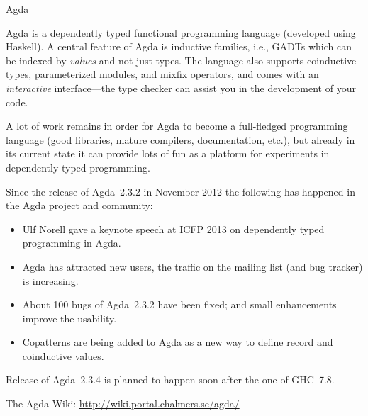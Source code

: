 \documentclass{article}
\begin{document}
\begin{hcarentry}{Agda}
\label{agda}
\makeheader

Agda is a dependently typed functional programming language (developed
using Haskell). A central feature of Agda is inductive families,
i.e., GADTs which can be indexed by \emph{values} and not just types.
The language also supports coinductive types, parameterized modules,
and mixfix operators, and comes with an \emph{interactive}
interface---the type checker can assist you in the development of your
code.

A lot of work remains in order for Agda to become a full-fledged
programming language (good libraries, mature compilers, documentation,
etc.), but already in its current state it can provide lots of fun as
a platform for experiments in dependently typed programming.

Since the release of Agda~2.3.2 in November 2012 the following has
happened in the Agda project and community:
\begin{itemize}
\item Ulf Norell gave a keynote speech at ICFP 2013 on dependently
  typed programming in Agda.
\item Agda has attracted new users, the traffic on the mailing list
  (and bug tracker) is increasing.
\item About 100 bugs of Agda~2.3.2 have been fixed; and small
  enhancements improve the usability.
\item Copatterns are being added to Agda as a new way to define record
  and coinductive values.
\end{itemize}
Release of Agda~2.3.4 is planned to happen soon after the one of GHC~7.8.

\FurtherReading
  The Agda Wiki: \url{http://wiki.portal.chalmers.se/agda/}
\end{hcarentry}
\end{document}
